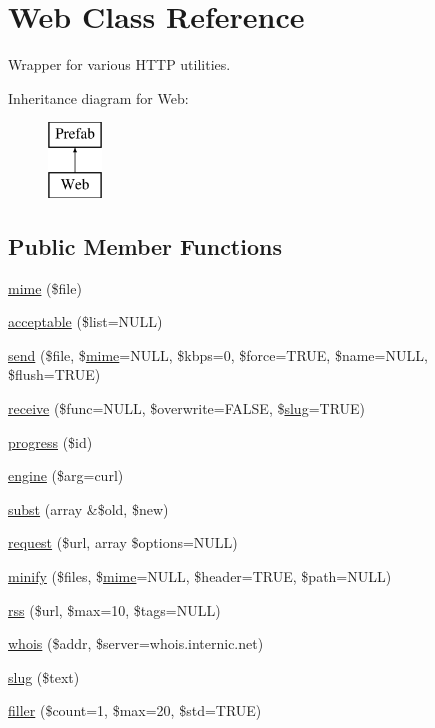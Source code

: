 \hypertarget{class_web}{}\section{Web Class Reference}
\label{class_web}


Wrapper for various H\+T\+TP utilities.  


Inheritance diagram for Web\+:\begin{figure}[H]
\begin{center}
\leavevmode
\includegraphics[height=2.000000cm]{class_web}
\end{center}
\end{figure}
\subsection*{Public Member Functions}
\begin{DoxyCompactItemize}
\item 
\hyperlink{class_web_a9cc4be82bd4865d5a006b4dd9fd174e5}{mime} (\$file)
\item 
\hyperlink{class_web_a67e70e21f07d54392cae50a140364268}{acceptable} (\$list=N\+U\+LL)
\item 
\hyperlink{class_web_a934eb97d44438943be35debae7302d8b}{send} (\$file, \$\hyperlink{class_web_a9cc4be82bd4865d5a006b4dd9fd174e5}{mime}=N\+U\+LL, \$kbps=0, \$force=T\+R\+UE, \$name=N\+U\+LL, \$flush=T\+R\+UE)
\item 
\hyperlink{class_web_a79336815638441bef6c31aa5961d88f0}{receive} (\$func=N\+U\+LL, \$overwrite=F\+A\+L\+SE, \$\hyperlink{class_web_a286c5e5759ec08bb103644e94de36b6f}{slug}=T\+R\+UE)
\item 
\hyperlink{class_web_a4a4e737abfbb551eb6c7ed583b042f93}{progress} (\$id)
\item 
\hyperlink{class_web_acf129dacf0ba4cb911f6573f8e24db54}{engine} (\$arg=\textquotesingle{}curl\textquotesingle{})
\item 
\hyperlink{class_web_acd091c5f2f55c3f0f5e1fce9dee1d76a}{subst} (array \&\$old, \$new)
\item 
\hyperlink{class_web_a65cd2273bee13f75e76463c5572e52ed}{request} (\$url, array \$options=N\+U\+LL)
\item 
\hyperlink{class_web_aa88be714af262e04d1468bf598880950}{minify} (\$files, \$\hyperlink{class_web_a9cc4be82bd4865d5a006b4dd9fd174e5}{mime}=N\+U\+LL, \$header=T\+R\+UE, \$path=N\+U\+LL)
\item 
\hyperlink{class_web_a6f4ec553292183f289c69a960578fe48}{rss} (\$url, \$max=10, \$tags=N\+U\+LL)
\item 
\hyperlink{class_web_acfaab3ed713ef4f5f14e1de378596d02}{whois} (\$addr, \$server=\textquotesingle{}whois.\+internic.\+net\textquotesingle{})
\item 
\hyperlink{class_web_a286c5e5759ec08bb103644e94de36b6f}{slug} (\$text)
\item 
\hyperlink{class_web_a0440b1db902b2ad8390cd1873c5aef76}{filler} (\$count=1, \$max=20, \$std=T\+R\+UE)
\end{DoxyCompactItemize}
